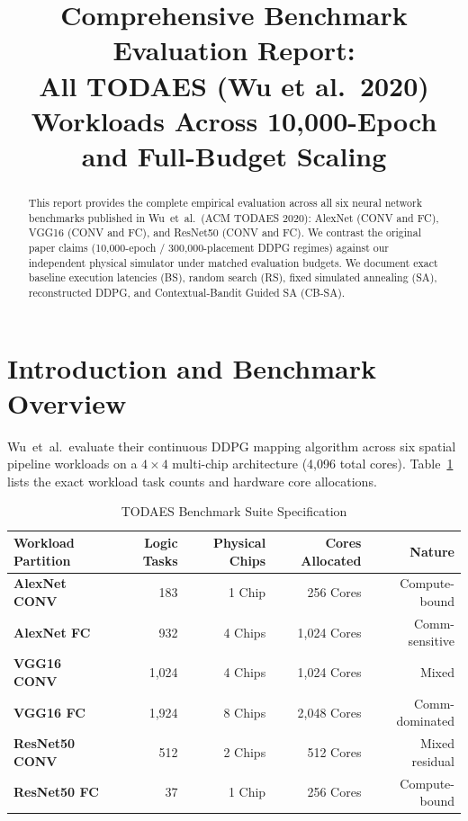 \documentclass[10pt,conference]{IEEEtran}
\begin{document}
\title{Comprehensive Benchmark Evaluation Report:\\All TODAES (Wu et al.\ 2020) Workloads Across 10,000-Epoch\\and Full-Budget Scaling}

\author{
}

\maketitle

\begin{abstract}
This report provides the complete empirical evaluation across all six neural network benchmarks published in Wu~et~al.\ (ACM TODAES 2020): AlexNet (CONV and FC), VGG16 (CONV and FC), and ResNet50 (CONV and FC). We contrast the original paper claims (10,000-epoch / 300,000-placement DDPG regimes) against our independent physical simulator under matched evaluation budgets. We document exact baseline execution latencies (BS), random search (RS), fixed simulated annealing (SA), reconstructed DDPG, and Contextual-Bandit Guided SA (CB-SA).
\end{abstract}

\section{Introduction and Benchmark Overview}
Wu~et~al.\ evaluate their continuous DDPG mapping algorithm across six spatial pipeline workloads on a $4 \times 4$ multi-chip architecture (4,096 total cores). Table~\ref{tab:benchmarks-summary} lists the exact workload task counts and hardware core allocations.

\begin{table}[htbp]
  \caption{TODAES Benchmark Suite Specification}
  \label{tab:benchmarks-summary}
  \centering
  \small
  \begin{tabular}{lrrrr}
    \toprule
    Workload Partition & Logic Tasks & Physical Chips & Cores Allocated & Nature \\
    \midrule
    \textbf{AlexNet CONV} & 183 & 1 Chip & 256 Cores & Compute-bound \\
    \textbf{AlexNet FC}   & 932 & 4 Chips & 1,024 Cores & Comm-sensitive \\
    \textbf{VGG16 CONV}   & 1,024 & 4 Chips & 1,024 Cores & Mixed \\
    \textbf{VGG16 FC}     & 1,924 & 8 Chips & 2,048 Cores & Comm-dominated \\
    \textbf{ResNet50 CONV}& 512 & 2 Chips & 512 Cores & Mixed residual \\
    \textbf{ResNet50 FC}  & 37 & 1 Chip & 256 Cores & Compute-bound \\
    \bottomrule
  \end{tabular}
\end{table}
\end{document}
